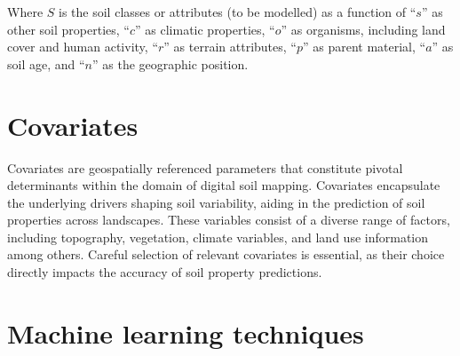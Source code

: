 \documentclass[
  10pt,
  b5paper,
  oneside]{book}
\begin{document}
Where \(S\) is the soil classes or attributes (to be modelled) as a function of ``\(s\)'' as other soil properties, ``\(c\)'' as climatic properties, ``\(o\)'' as organisms, including land cover and human activity, ``\(r\)'' as terrain attributes, ``\(p\)'' as parent material, ``\(a\)'' as soil age, and ``\(n\)'' as the geographic position.

\hypertarget{covariates}{%
\section{Covariates}\label{covariates}}

Covariates are geospatially referenced parameters that constitute pivotal determinants within the domain of digital soil mapping. Covariates encapsulate the underlying drivers shaping soil variability, aiding in the prediction of soil properties across landscapes. These variables consist of a diverse range of factors, including topography, vegetation, climate variables, and land use information among others. Careful selection of relevant covariates is essential, as their choice directly impacts the accuracy of soil property predictions.

\hypertarget{machine-learning-techniques}{%
\section{Machine learning techniques}\label{machine-learning-techniques}}
\end{document}

